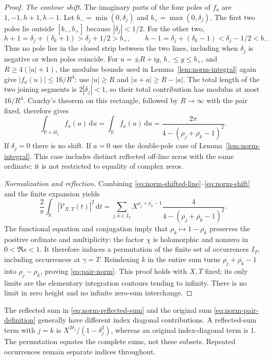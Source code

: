 \documentclass[11pt]{article}
\newcommand{\dd}{\,\mathrm d}
\newcommand{\ii}{\mathrm i}
\newcommand{\VS}{\mathcal V}
\begin{document}
\begin{proof}
\textit{The contour shift.}
The imaginary parts of the four poles of \(f_a\) are
\(1,-1,h+1,h-1\). Let
\(b_- =\min(0,\delta_j)\) and \(b_+=\max(0,\delta_j)\).
The first two poles lie outside \([b_-,b_+]\) because
\(|\delta_j|<1/2\). For the other two,
\[
 h+1=\delta_j+(\delta_k+1)>\delta_j+1/2>b_+,
 \qquad
 h-1=\delta_j+(\delta_k-1)<\delta_j-1/2<b_-.
\]
Thus no pole lies in the closed strip between the two lines, including
when \(\delta_j\) is negative or when poles coincide.
For \(u=\pm R+\ii y\), \(b_-\leq y\leq b_+\), and
\(R\geq4(|a|+1)\), the modulus bounds used in
Lemma~\ref{lem:norm-integral} again give \(|f_a(u)|\leq16/R^4\):
use \(|u|\geq R\) and \(|u+a|\geq R-|a|\).
The total length of the two joining segments is
\(2|\delta_j|<1\), so their total contribution has modulus at most
\(16/R^4\). Cauchy's theorem on this rectangle, followed by
\(R\to\infty\) with the pair fixed, therefore gives
\begin{equation}\label{eq:norm-shift}
 \int_{\mathbb R+\ii\delta_j}f_a(u)\dd u
 =\int_{\mathbb R}f_a(u)\dd u
 =\frac{2\pi}{4-(\rho_j+\overline{\rho_k}-1)^2}.
\end{equation}
If \(\delta_j=0\) there is no shift. If \(a=0\) use the double-pole
case of Lemma~\ref{lem:norm-integral}. This case includes distinct
reflected off-line zeros with the same ordinate; it is not restricted
to equality of complex zeros.

\textit{Normalization and reflection.}
Combining \eqref{eq:norm-shifted-line}--\eqref{eq:norm-shift} and
the finite expansion yields
\begin{equation}\label{eq:norm-reflected-sum}
 \frac2\pi\int_{\mathbb R}|\VS_{X,T}(t)|^2\dd t
 =\sum_{j,k\in I_T}
 X^{\rho_j+\overline{\rho_k}-1}
 \frac4{4-(\rho_j+\overline{\rho_k}-1)^2}.
\end{equation}
The functional equation and conjugation imply that
\(\rho_k\mapsto1-\overline{\rho_k}\) preserves the positive ordinate
and multiplicity: the factor \(\chi\) is holomorphic and nonzero in
\(0<\Re s<1\). It therefore induces a permutation of the finite set
of occurrences \(I_T\), including occurrences at \(\gamma=T\).
Reindexing \(k\) in the entire sum turns
\(\rho_j+\overline{\rho_k}-1\) into \(\rho_j-\rho_k\), proving
\eqref{eq:pair-norm}.
This proof holds with \(X,T\) fixed; its only limits are the elementary
integration contours tending to infinity. There is no limit in zero
height and no infinite zero-sum interchange.
\end{proof}

The reflected sum in \eqref{eq:norm-reflected-sum} and the original
sum \eqref{eq:norm-pair-definition} generally have different index
diagonal contributions. A reflected-sum term with \(j=k\) is
\(X^{2\delta_j}/(1-\delta_j^2)\), whereas an original index-diagonal
term is 1. The permutation equates the complete sums, not these
subsets. Repeated occurrences remain separate indices throughout.
\end{document}
